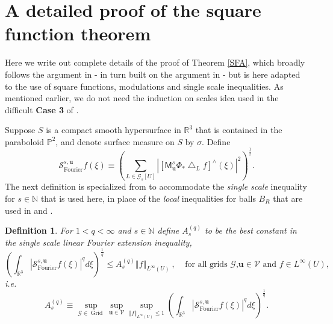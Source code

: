 \documentclass{amsart}%
\theoremstyle{plain}
\newtheorem{definition}[theorem]{Definition}
\numberwithin{equation}{section}
\begin{document}
\section{A detailed proof of the square function theorem}

Here we write out complete details of the proof of Theorem \ref{SFA}, which
broadly follows the argument in \cite[proof of Theorem 3]{RiSa} - in turn
built on the argument in \cite[Section 2]{BoGu} - but is here adapted to the
use of square functions, modulations and single scale inequalities. As
mentioned earlier, we do not need the induction on scales idea used in the
difficult \textbf{Case 3} of \cite[Section 2]{BoGu}.

Suppose $S$ is a compact smooth hypersurface in $\mathbb{R}^{3}$ that is
contained in the paraboloid $\mathbb{P}^{2}$, and denote surface measure on
$S$ by $\sigma$. Define%
\[
\mathcal{S}_{\operatorname*{Fourier}}^{s,\mathbf{u}}f\left(  \xi\right)
\equiv\left(  \sum_{L\in\mathcal{G}_{s}\left[  U\right]  }\left\vert \left[
\mathsf{M}_{\mathbf{u}}^{s}\Phi_{\ast}\bigtriangleup_{L}f\right]  ^{\wedge
}\left(  \xi\right)  \right\vert ^{2}\right)  ^{\frac{1}{2}}.
\]
The next definition is specialized from \cite{BoGu} to accommodate the
\emph{single scale} inequality for $s\in\mathbb{N}$ that is used here, in
place of the \emph{local} inequalities for balls $B_{R}$ that are used in
\cite{BoGu} and \cite{RiSa}.

\begin{definition}
For $1<q<\infty$ and $s\in\mathbb{N}$ define $A_{s}^{\left(  q\right)  }$ to
be the best constant in the single scale linear Fourier extension inequality,
\[
\left(  \int_{\mathbb{R}^{3}}\left\vert \mathcal{S}_{\operatorname*{Fourier}%
}^{s,\mathbf{u}}f\left(  \xi\right)  \right\vert ^{q}d\xi\right)  ^{\frac
{1}{q}}\leq A_{s}^{\left(  q\right)  }\left\Vert f\right\Vert _{L^{\infty
}\left(  U\right)  }\ ,\ \ \ \ \ \text{for all grids }\mathcal{G}\text{,
}\mathbf{u}\in\mathcal{V}\text{ and }f\in L^{\infty}\left(  U\right)  ,
\]
i.e.
\begin{equation}
A_{s}^{\left(  q\right)  }\equiv\sup_{\mathcal{G}\in\operatorname*{Grid}}%
\sup_{\mathbf{u}\in\mathcal{V}}\sup_{\left\Vert f\right\Vert _{L^{\infty
}\left(  U\right)  }\leq1}\left(  \int_{\mathbb{R}^{3}}\left\vert
\mathcal{S}_{\operatorname*{Fourier}}^{s,\mathbf{u}}f\left(  \xi\right)
\right\vert ^{q}d\xi\right)  ^{\frac{1}{q}}. \label{Q_R}%
\end{equation}

\end{definition}
\end{document}
